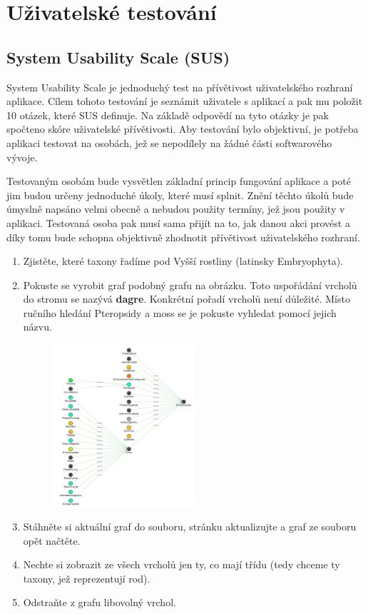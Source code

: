 \chapter{Uživatelské testování}

\section{System Usability Scale (SUS)}
System Usability Scale je jednoduchý test na přívětivost uživatelského rozhraní aplikace. Cílem tohoto testování je seznámit uživatele s aplikací a pak mu položit 10 otázek, které SUS definuje. Na základě odpovědí na tyto otázky je pak spočteno skóre uživatelské přívětivosti. Aby testování bylo objektivní, je potřeba aplikaci testovat na osobách, jež se nepodílely na žádné části softwarového vývoje.

Testovaným osobám bude vysvětlen základní princip fungování aplikace a poté jim budou určeny jednoduché úkoly, které musí splnit. Znění těchto úkolů bude úmyslně napsáno velmi obecně a nebudou použity termíny, jež jsou použity v aplikaci. Testovaná osoba pak musí sama přijít na to, jak danou akci provést a díky tomu bude schopna objektivně zhodnotit přívětivost uživatelského rozhraní.

\begin{enumerate}
    \item Zjistěte, které taxony řadíme pod Vyšší rostliny (latinsky Embryophyta).
    \item Pokuste se vyrobit graf podobný grafu na obrázku. Toto uspořádání vrcholů do stromu se nazývá \textbf{dagre}. Konkrétní pořadí vrcholů není důležité. Místo ručního hledání Pteropsidy a moss se je pokuste vyhledat pomocí jejich názvu.
    \begin{figure}[h]
        \centering
        \includegraphics[width=0.5\textwidth]{media/sus-dagre.png}
    \end{figure}
    \item Stáhněte si aktuální graf do souboru, stránku aktualizujte a graf ze souboru opět načtěte.
    \item Nechte si zobrazit ze všech vrcholů jen ty, co mají třídu  (tedy chceme ty taxony, jež reprezentují rod).
    \item Odstraňte z grafu libovolný vrchol.
\end{enumerate}

